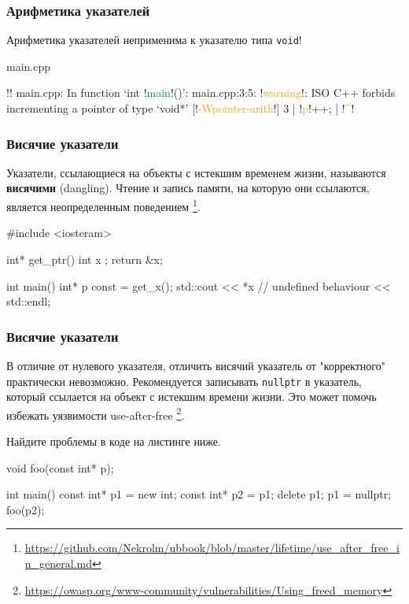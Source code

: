 \documentclass[compress, 8pt]{beamer}
\begin{document}
\begin{frame}[fragile]

    \frametitle{Арифметика указателей}

    Арифметика указателей неприменима к указателю типа \verb|void|!

        {main.cpp}

    \begin{terminalwindow}
!!
main.cpp: In function ‘int !\textcolor{teal}{main}!()’:
main.cpp:3:5: !\textcolor{orange}{warning}!: ISO C++ forbids incrementing a pointer of type ‘void*’ [!\textcolor{orange}{-Wpointer-arith}!]
    3 |     !\textcolor{orange}{p}!++;
      |     !\textcolor{orange}{\^{}}!
    \end{terminalwindow}

\end{frame}

\begin{frame}[fragile]

    \frametitle{Висячие указатели}

    Указатели, ссылающиеся на объекты с истекшим временем жизни,
    называются \textbf{висячими} (dangling).
    Чтение и запись памяти, на которую они ссылаются, является неопределенным
    поведением
    \footnote{\url{https://github.com/Nekrolm/ubbook/blob/master/lifetime/use\_after\_free\_in\_general.md}}.

    \begin{myinplacelisting}[minted language=cpp]
#include <iosteram>

int* get_ptr() {
    int x {};
    return &x;
}

int main() {
    int* p const = get_x();
    std::cout << *x // undefined behaviour
        << std::endl;
}
    \end{myinplacelisting}

\end{frame}

\begin{frame}[fragile]

    \frametitle{Висячие указатели}

    В отличие от нулевого указателя, отличить висячий указатель от
    "корректного" практически невозможно.
    Рекомендуется записывать \verb|nullptr| в указатель, который ссылается
    на объект с истекшим времени жизни.
    Это может помочь избежать уязвимости use-after-free
    \footnote{\url{https://owasp.org/www-community/vulnerabilities/Using\_freed\_memory}}.

    \begin{task}
        Найдите проблемы в коде на листинге ниже.
    \end{task}

    \begin{myinplacelisting}[minted language=cpp]
void foo(const int* p);

int main() {
    const int* p1 = new int;
    const int* p2 = p1;
    delete p1;
    p1 = nullptr;
    foo(p2);
}
    \end{myinplacelisting}

\end{frame}
\end{document}
